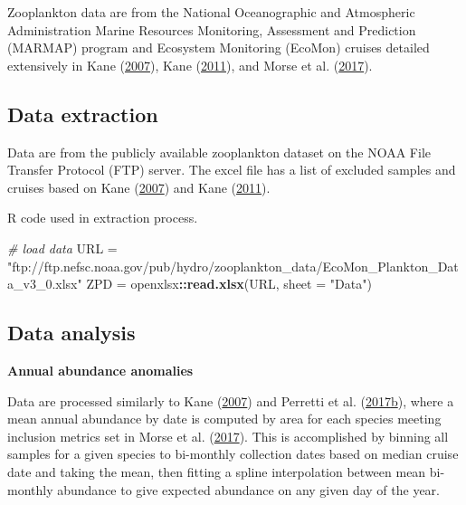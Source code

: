 \documentclass[
]{book}
\newenvironment{Shaded}{\begin{snugshade}}{\end{snugshade}}
\newcommand{\CommentTok}[1]{\textcolor[rgb]{0.56,0.35,0.01}{\textit{#1}}}
\newcommand{\DataTypeTok}[1]{\textcolor[rgb]{0.13,0.29,0.53}{#1}}
\newcommand{\KeywordTok}[1]{\textcolor[rgb]{0.13,0.29,0.53}{\textbf{#1}}}
\newcommand{\NormalTok}[1]{#1}
\newcommand{\OperatorTok}[1]{\textcolor[rgb]{0.81,0.36,0.00}{\textbf{#1}}}
\newcommand{\StringTok}[1]{\textcolor[rgb]{0.31,0.60,0.02}{#1}}
\begin{document}
Zooplankton data are from the National Oceanographic and Atmospheric Administration Marine Resources Monitoring, Assessment and Prediction (MARMAP) program and Ecosystem Monitoring (EcoMon) cruises detailed extensively in Kane (\protect\hyperlink{ref-Kane2007}{2007}), Kane (\protect\hyperlink{ref-Kane2011}{2011}), and Morse et al. (\protect\hyperlink{ref-Morse2017}{2017}).

\hypertarget{data-extraction-36}{%
\subsection{Data extraction}\label{data-extraction-36}}

Data are from the publicly available zooplankton dataset on the NOAA File Transfer Protocol (FTP) server. The excel file has a list of excluded samples and cruises based on Kane (\protect\hyperlink{ref-Kane2007}{2007}) and Kane (\protect\hyperlink{ref-Kane2011}{2011}).

R code used in extraction process.

\begin{Shaded}
\begin{Highlighting}[]
\CommentTok{\# load data}
\NormalTok{URL =}\StringTok{ "ftp://ftp.nefsc.noaa.gov/pub/hydro/zooplankton\_data/EcoMon\_Plankton\_Data\_v3\_0.xlsx"}
\NormalTok{ZPD =}\StringTok{ }\NormalTok{openxlsx}\OperatorTok{::}\KeywordTok{read.xlsx}\NormalTok{(URL, }\DataTypeTok{sheet =} \StringTok{"Data"}\NormalTok{)}
\end{Highlighting}
\end{Shaded}

\hypertarget{data-analysis-44}{%
\subsection{Data analysis}\label{data-analysis-44}}

\textbf{Annual abundance anomalies}

Data are processed similarly to Kane (\protect\hyperlink{ref-Kane2007}{2007}) and Perretti et al. (\protect\hyperlink{ref-Perretti2017}{2017}\protect\hyperlink{ref-Perretti2017}{b}), where a mean annual abundance by date is computed by area for each species meeting inclusion metrics set in Morse et al. (\protect\hyperlink{ref-Morse2017}{2017}). This is accomplished by binning all samples for a given species to bi-monthly collection dates based on median cruise date and taking the mean, then fitting a spline interpolation between mean bi-monthly abundance to give expected abundance on any given day of the year.
\end{document}
